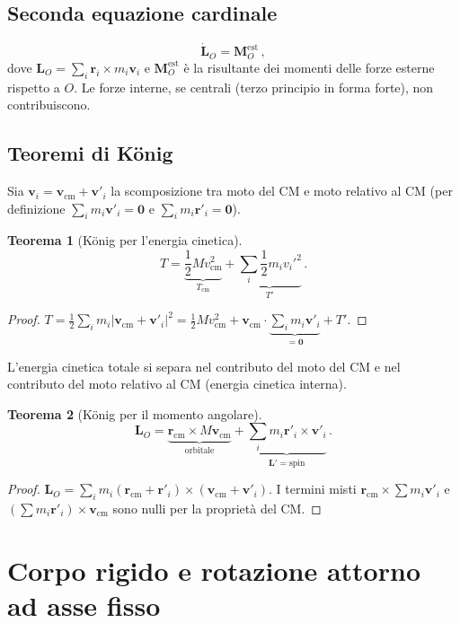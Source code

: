 \documentclass[11pt,a4paper]{article}
\renewcommand{\vec}[1]{\bm{#1}}
\newcommand{\CM}{\mathrm{cm}}
\theoremstyle{plain}
\newtheorem{teorema}{Teorema}[section]
\theoremstyle{definition}
\theoremstyle{remark}
\begin{document}
\subsection{Seconda equazione cardinale}

\[
  \dot{\vec{L}}_O=\vec{M}_O^\mathrm{est}\,,
\]
dove $\vec{L}_O=\sum_i\vec{r}_i\times m_i\vec{v}_i$ e $\vec{M}_O^\mathrm{est}$
è la risultante dei momenti delle forze esterne rispetto a $O$. Le forze
interne, se centrali (terzo principio in forma forte), non contribuiscono.

\subsection{Teoremi di König}

Sia $\vec{v}_i=\vec{v}_\CM+\vec{v}'_i$ la scomposizione tra moto del CM e
moto relativo al CM (per definizione $\sum_i m_i\vec{v}'_i=\vec{0}$ e
$\sum_i m_i\vec{r}'_i=\vec{0}$).

\begin{teorema}[König per l'energia cinetica]
\[
  T=\underbrace{\frac{1}{2}Mv_\CM^2}_{T_\CM}+\underbrace{\sum_i\frac{1}{2}m_iv_i'^2}_{T'}\,.
\]
\end{teorema}
\begin{proof}
$T=\tfrac{1}{2}\sum_i m_i|\vec{v}_\CM+\vec{v}'_i|^2
  =\tfrac{1}{2}Mv_\CM^2
  +\vec{v}_\CM\cdot\underbrace{\sum_i m_i\vec{v}'_i}_{=\vec{0}}
  +T'$.
\end{proof}
L'energia cinetica totale si separa nel contributo del moto del CM e nel
contributo del moto relativo al CM (energia cinetica interna).

\begin{teorema}[König per il momento angolare]
\[
  \vec{L}_O=\underbrace{\vec{r}_\CM\times M\vec{v}_\CM}_{\text{orbitale}}
            +\underbrace{\sum_i m_i\vec{r}'_i\times\vec{v}'_i}_{\vec{L}'=\text{spin}}\,.
\]
\end{teorema}
\begin{proof}
$\vec{L}_O=\sum_i m_i(\vec{r}_\CM+\vec{r}'_i)\times(\vec{v}_\CM+\vec{v}'_i)$.
I termini misti $\vec{r}_\CM\times\sum m_i\vec{v}'_i$ e
$(\sum m_i\vec{r}'_i)\times\vec{v}_\CM$ sono nulli per la proprietà del CM.
\end{proof}

\section{Corpo rigido e rotazione attorno ad asse fisso}
\end{document}
